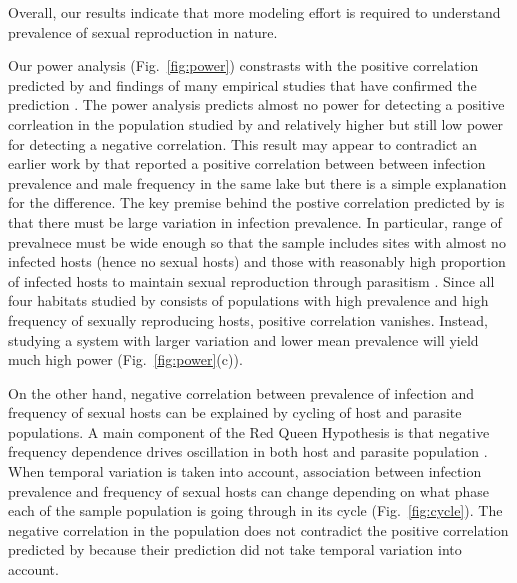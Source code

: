 \documentclass{article}\usepackage[]{graphicx}\usepackage[]{color}
\newcommand{\fref}[1]{Fig.~\ref{fig:#1}}
\begin{document}
Overall, our results indicate that more modeling effort is required to understand prevalence of sexual reproduction in nature.

Our power analysis (\fref{power}) constrasts with the positive correlation predicted by \cite{lively1992parthenogenesis, lively2001trematode} and findings of many empirical studies that have confirmed the prediction \citep{lively1987evidence, lively2002temporal, kumpulainen2004parasites, vergara2013geographic, mckone2016fine}.
The power analysis predicts almost no power for detecting a positive corrleation in the population studied by \cite{vergara2014infection} and relatively higher but still low power for detecting a negative correlation.
This result may appear to contradict an earlier work by \cite{vergara2013geographic} that reported a positive correlation between between infection prevalence and male frequency in the same lake but there is a simple explanation for the difference.
The key premise behind the postive correlation predicted by \cite{lively2001trematode} is that there must be large variation in infection prevalence.
In particular, range of prevalnece must be wide enough so that the sample includes sites with almost no infected hosts (hence no sexual hosts) and those with reasonably high proportion of infected hosts to maintain sexual reproduction through parasitism \citep{lively2001trematode}.
Since all four habitats studied by \cite{vergara2014infection} consists of populations with high prevalence and high frequency of sexually reproducing hosts, positive correlation vanishes.
Instead, studying a system with larger variation and lower mean prevalence will yield much high power (\fref{power}(c)).

On the other hand, negative correlation between prevalence of infection and frequency of sexual hosts can be explained by cycling of host and parasite populations.
A main component of the Red Queen Hypothesis is that negative frequency dependence drives oscillation in both host and parasite population \citep{hamilton1980sex}.
When temporal variation is taken into account, association between infection prevalence and frequency of sexual hosts can change depending on what phase each of the sample population is going through in its cycle (\fref{cycle}).
The negative correlation in the population does not contradict the positive correlation predicted by \cite{lively2001trematode} because their prediction did not take temporal variation into account.
\end{document}
